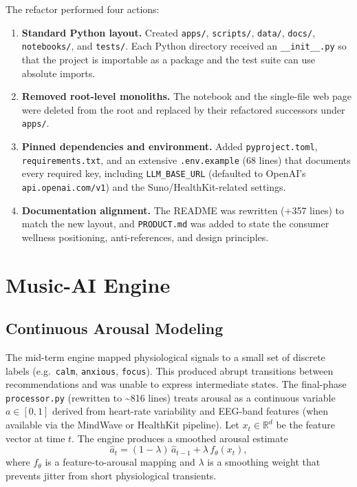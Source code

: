 \documentclass[11pt,a4paper]{article}
\begin{document}
The refactor performed four actions:

\begin{enumerate}[leftmargin=*]
  \item \textbf{Standard Python layout.} Created \texttt{apps/}, \texttt{scripts/},
    \texttt{data/}, \texttt{docs/}, \texttt{notebooks/}, and \texttt{tests/}.
    Each Python directory received an \texttt{\_\_init\_\_.py} so that the
    project is importable as a package and the test suite can use absolute
    imports.
  \item \textbf{Removed root-level monoliths.} The notebook and the single-file
    web page were deleted from the root and replaced by their refactored
    successors under \texttt{apps/}.
  \item \textbf{Pinned dependencies and environment.} Added
    \texttt{pyproject.toml}, \texttt{requirements.txt}, and an extensive
    \texttt{.env.example} (68 lines) that documents every required key,
    including \texttt{LLM\_BASE\_URL} (defaulted to OpenAI's
    \texttt{api.openai.com/v1}) and the Suno/HealthKit-related settings.
  \item \textbf{Documentation alignment.} The README was rewritten (+357
    lines) to match the new layout, and \texttt{PRODUCT.md} was added to
    state the consumer wellness positioning, anti-references, and design
    principles.
\end{enumerate}

\section{Music-AI Engine}

\subsection{Continuous Arousal Modeling}

The mid-term engine mapped physiological signals to a small set of discrete
labels (e.g.\ \texttt{calm}, \texttt{anxious}, \texttt{focus}). This produced
abrupt transitions between recommendations and was unable to express
intermediate states. The final-phase \texttt{processor.py} (rewritten to
\textasciitilde 816 lines) treats arousal as a continuous variable
$a \in [0,1]$ derived from heart-rate variability and EEG-band features
(when available via the MindWave or HealthKit pipeline). Let
$x_t \in \mathbb{R}^d$ be the feature vector at time $t$. The engine produces
a smoothed arousal estimate
\[
  \hat a_t = (1-\lambda)\,\hat a_{t-1} + \lambda\, f_\theta(x_t),
\]
where $f_\theta$ is a feature-to-arousal mapping and $\lambda$ is a smoothing
weight that prevents jitter from short physiological transients.
\end{document}
